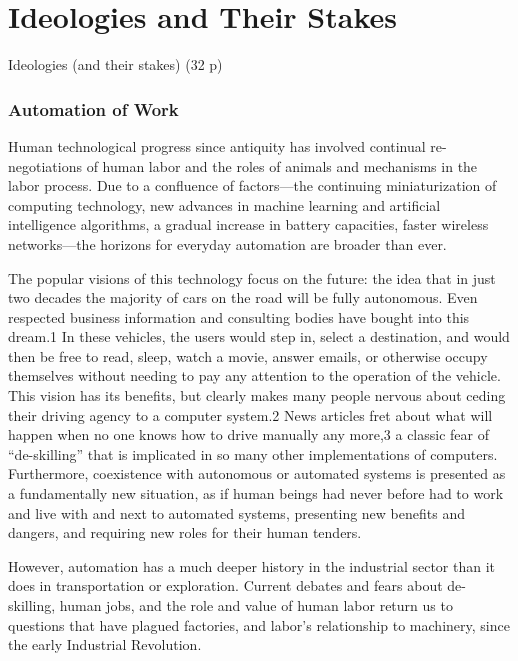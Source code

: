 \chapter{Ideologies and Their Stakes}

Ideologies (and their stakes) (32 p)

\subsection{Automation of Work}

Human technological progress since antiquity has
involved continual re-negotiations of human labor and the roles of
animals and mechanisms in the labor process. Due to a confluence
of factors—the continuing miniaturization of computing technology, new
advances in machine learning and artificial intelligence algorithms, a
gradual increase in battery capacities, faster wireless networks—the
horizons for everyday automation are broader than ever. 

The popular visions of this technology focus on the future: the
idea that in just two decades the majority of cars on the road will be
fully autonomous. Even respected business information and consulting
bodies have bought into this dream.1 In these vehicles, the users would
step in, select a destination, and would then be free to read, sleep,
watch a movie, answer emails, or otherwise occupy themselves without
needing to pay any attention to the operation of the vehicle. This
vision has its benefits, but clearly makes many people nervous about
ceding their driving agency to a computer system.2 News articles fret
about what will happen when no one knows how to drive manually any
more,3 a classic fear of “de-skilling” that is implicated in so many
other implementations of computers. Furthermore, coexistence with
autonomous or automated systems is presented as a fundamentally new
situation, as if human beings had never before had to work and live
with and next to automated systems, presenting new benefits and
dangers, and requiring new roles for their human tenders.

However, automation has a much deeper
history in the industrial sector than it does in transportation or
exploration. Current debates and fears about de-skilling, human jobs,
and the role and value of human labor return us to questions that have
plagued factories, and labor's relationship to machinery, since the
early Industrial Revolution.


